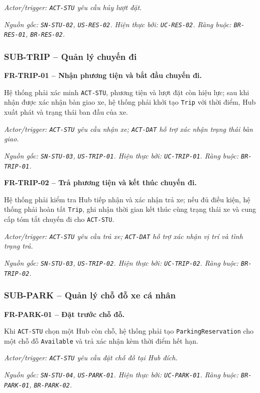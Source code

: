 \textit{Actor/trigger: \texttt{ACT-STU} yêu cầu hủy lượt đặt.}\par
\textit{Nguồn gốc: \texttt{SN-STU-02}, \texttt{US-RES-02}. Hiện thực bởi: \texttt{UC-RES-02}. Ràng buộc: \texttt{BR-RES-01}, \texttt{BR-RES-02}.}

\subsubsection{SUB-TRIP -- Quản lý chuyến đi}

\noindent\textbf{FR-TRIP-01 -- Nhận phương tiện và bắt đầu chuyến đi.}\par
\nopagebreak[4]
Hệ thống phải xác minh \texttt{ACT-STU}, phương tiện và lượt đặt còn hiệu lực; sau khi nhận được xác nhận bàn giao xe, hệ thống phải khởi tạo \texttt{Trip} với thời điểm, Hub xuất phát và trạng thái ban đầu của xe.

\textit{Actor/trigger: \texttt{ACT-STU} yêu cầu nhận xe; \texttt{ACT-DAT} hỗ trợ xác nhận trạng thái bàn giao.}\par
\textit{Nguồn gốc: \texttt{SN-STU-03}, \texttt{US-TRIP-01}. Hiện thực bởi: \texttt{UC-TRIP-01}. Ràng buộc: \texttt{BR-TRIP-01}.}

\medskip
\noindent\textbf{FR-TRIP-02 -- Trả phương tiện và kết thúc chuyến đi.}\par
\nopagebreak[4]
Hệ thống phải kiểm tra Hub tiếp nhận và xác nhận trả xe; nếu đủ điều kiện, hệ thống phải hoàn tất \texttt{Trip}, ghi nhận thời gian kết thúc cùng trạng thái xe và cung cấp tóm tắt chuyến đi cho \texttt{ACT-STU}.

\textit{Actor/trigger: \texttt{ACT-STU} yêu cầu trả xe; \texttt{ACT-DAT} hỗ trợ xác nhận vị trí và tình trạng trả.}\par
\textit{Nguồn gốc: \texttt{SN-STU-03}, \texttt{US-TRIP-02}. Hiện thực bởi: \texttt{UC-TRIP-02}. Ràng buộc: \texttt{BR-TRIP-02}.}

\subsubsection{SUB-PARK -- Quản lý chỗ đỗ xe cá nhân}

\noindent\textbf{FR-PARK-01 -- Đặt trước chỗ đỗ.}\par
\nopagebreak[4]
Khi \texttt{ACT-STU} chọn một Hub còn chỗ, hệ thống phải tạo \texttt{ParkingReservation} cho một chỗ đỗ \texttt{Available} và trả xác nhận kèm thời điểm hết hạn.

\textit{Actor/trigger: \texttt{ACT-STU} yêu cầu đặt chỗ đỗ tại Hub đích.}\par
\textit{Nguồn gốc: \texttt{SN-STU-04}, \texttt{US-PARK-01}. Hiện thực bởi: \texttt{UC-PARK-01}. Ràng buộc: \texttt{BR-PARK-01}, \texttt{BR-PARK-02}.}

